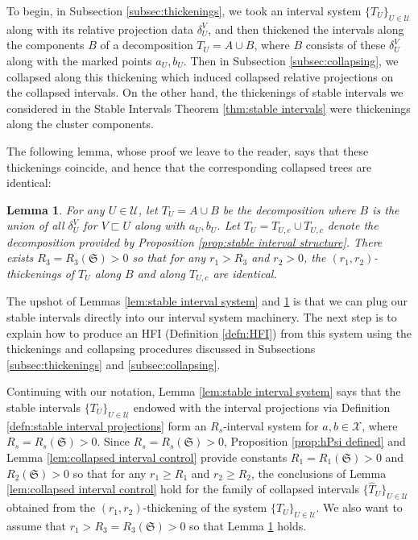 \documentclass{amsart}
\newtheorem{lemma}[theorem]{Lemma}
\theoremstyle{definition}
\theoremstyle{remark}
\theoremstyle{definition}
\newcommand{\calU}{\mathcal{U}}
\newcommand{\calX}{\mathcal{X}}
\newcommand{\hT}{\widehat{T}}
\newcommand{\nest}{\sqsubset}
\begin{document}
To begin, in Subsection \ref{subsec:thickenings}, we took an interval system $\{T_U\}_{U \in \calU}$ along with its relative projection data $\delta^V_U$, and then thickened the intervals along the components $B$ of a decomposition $T_U = A \cup B$, where $B$ consists of these $\delta^V_U$ along with the marked points $a_U,b_U$.  Then in Subsection \ref{subsec:collapsing}, we collapsed along this thickening which induced collapsed relative projections on the collapsed intervals.  On the other hand, the thickenings of stable intervals we considered in the Stable Intervals Theorem \ref{thm:stable intervals} were thickenings along the cluster components.

The following lemma, whose proof we leave to the reader, says that these thickenings coincide, and hence that the corresponding collapsed trees are identical:

\begin{lemma}\label{lem:same thickenings}
For any $U \in \calU$, let $T_U = A \cup B$ be the decomposition where $B$ is the union of all $\delta^V_U$ for $V \nest U$ along with $a_U,b_U$.  Let $T_U = T_{U,e} \cup T_{U,c}$ denote the decomposition provided by Proposition \ref{prop:stable interval structure}.  There exists $R_3 = R_3(\mathfrak S)>0$ so that for any $r_1>R_3$ and $r_2>0$, the $(r_1,r_2)$-thickenings of $T_U$ along $B$ and along $T_{U,c}$ are identical.
\end{lemma}




The upshot of Lemmas \ref{lem:stable interval system} and \ref{lem:same thickenings} is that we can plug our stable intervals directly into our interval system machinery.  The next step is to explain how to produce an HFI (Definition \ref{defn:HFI}) from this system using the thickenings and collapsing procedures discussed in Subsections \ref{subsec:thickenings} and \ref{subsec:collapsing}.

Continuing with our notation, Lemma \ref{lem:stable interval system} says that the stable intervals $\{T_U\}_{U \in \calU}$ endowed with the interval projections via Definition \ref{defn:stable interval projections} form an $R_s$-interval system for $a,b\in \calX$, where $R_s = R_s(\mathfrak S)>0$.  Since $R_s= R_s(\mathfrak S)>0$, Proposition \ref{prop:hPsi defined} and Lemma \ref{lem:collapsed interval control} provide constants $R_1 = R_1(\mathfrak S)>0$ and $R_2(\mathfrak S)>0$ so that for any $r_1\geq R_1$ and $r_2 \geq R_2$, the conclusions of Lemma \ref{lem:collapsed interval control} hold for the family of collapsed intervals $\{\hT_U\}_{U \in \calU}$ obtained from the $(r_1,r_2)$-thickening of the system $\{T_U\}_{U \in \calU}$.  We also want to assume that $r_1>R_3 = R_3(\mathfrak S)>0$ so that Lemma \ref{lem:same thickenings} holds.
\end{document}
